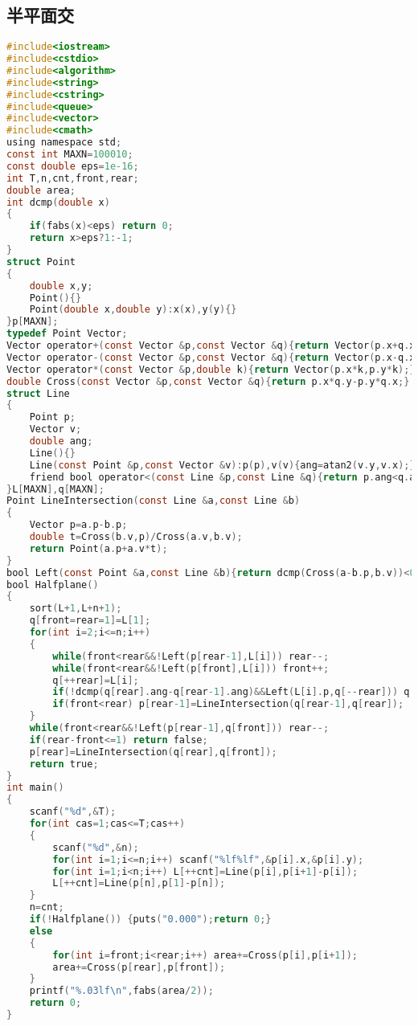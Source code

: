 \subsection{半平面交}
\begin{lstlisting}[language=C]
#include<iostream>
#include<cstdio>
#include<algorithm>
#include<string>
#include<cstring>
#include<queue>
#include<vector>
#include<cmath>
using namespace std;
const int MAXN=100010;
const double eps=1e-16;
int T,n,cnt,front,rear;
double area;
int dcmp(double x)
{
	if(fabs(x)<eps) return 0;
	return x>eps?1:-1;
}
struct Point
{
	double x,y;
	Point(){}
	Point(double x,double y):x(x),y(y){}
}p[MAXN];
typedef Point Vector;
Vector operator+(const Vector &p,const Vector &q){return Vector(p.x+q.x,p.y+q.y);}
Vector operator-(const Vector &p,const Vector &q){return Vector(p.x-q.x,p.y-q.y);}
Vector operator*(const Vector &p,double k){return Vector(p.x*k,p.y*k);}
double Cross(const Vector &p,const Vector &q){return p.x*q.y-p.y*q.x;}
struct Line
{
	Point p;
	Vector v;
	double ang;
	Line(){}
	Line(const Point &p,const Vector &v):p(p),v(v){ang=atan2(v.y,v.x);}
	friend bool operator<(const Line &p,const Line &q){return p.ang<q.ang;}
}L[MAXN],q[MAXN];
Point LineIntersection(const Line &a,const Line &b)
{
	Vector p=a.p-b.p;
	double t=Cross(b.v,p)/Cross(a.v,b.v);
	return Point(a.p+a.v*t);
}
bool Left(const Point &a,const Line &b){return dcmp(Cross(a-b.p,b.v))<0;}
bool Halfplane()
{
	sort(L+1,L+n+1);
	q[front=rear=1]=L[1];
	for(int i=2;i<=n;i++)
	{
		while(front<rear&&!Left(p[rear-1],L[i])) rear--;
		while(front<rear&&!Left(p[front],L[i])) front++;
		q[++rear]=L[i];
		if(!dcmp(q[rear].ang-q[rear-1].ang)&&Left(L[i].p,q[--rear])) q[rear]=L[i];
		if(front<rear) p[rear-1]=LineIntersection(q[rear-1],q[rear]);
	}
	while(front<rear&&!Left(p[rear-1],q[front])) rear--;
	if(rear-front<=1) return false;
	p[rear]=LineIntersection(q[rear],q[front]);
	return true;
}
int main()
{
	scanf("%d",&T);
	for(int cas=1;cas<=T;cas++)
	{
		scanf("%d",&n);
		for(int i=1;i<=n;i++) scanf("%lf%lf",&p[i].x,&p[i].y);
		for(int i=1;i<n;i++) L[++cnt]=Line(p[i],p[i+1]-p[i]);
		L[++cnt]=Line(p[n],p[1]-p[n]);
	}
	n=cnt;
	if(!Halfplane()) {puts("0.000");return 0;}
	else
	{
		for(int i=front;i<rear;i++) area+=Cross(p[i],p[i+1]);
		area+=Cross(p[rear],p[front]);
	}
	printf("%.03lf\n",fabs(area/2));
	return 0;
}
\end{lstlisting}